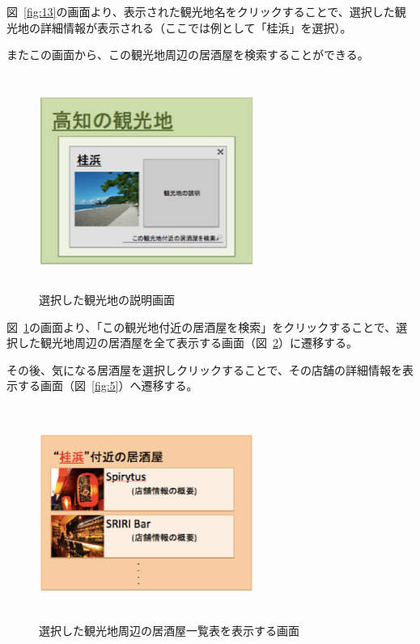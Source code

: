 図~\ref{fig:13}の画面より、表示された観光地名をクリックすることで、選択した観光地の詳細情報が表示される（ここでは例として「桂浜」を選択）。



またこの画面から、この観光地周辺の居酒屋を検索することができる。



\begin {figure}[!htbp]
    \begin{center}
    \includegraphics [height=7cm, width=7cm]{14.eps}
    \caption {選択した観光地の説明画面}
    \label {fig:14}
    \end{center}
\end {figure}



図~\ref{fig:14}の画面より、「この観光地付近の居酒屋を検索」をクリックすることで、選択した観光地周辺の居酒屋を全て表示する画面（図~\ref{fig:15}）に遷移する。



その後、気になる居酒屋を選択しクリックすることで、その店舗の詳細情報を表示する画面（図~\ref{fig:5}）へ遷移する。
\clearpage
\begin {figure}[!htbp]
    \begin{center}
    \includegraphics [height=7cm, width=7cm]{15.eps}
    \caption {選択した観光地周辺の居酒屋一覧表を表示する画面}
    \label {fig:15}
    \end{center}
\end {figure}



